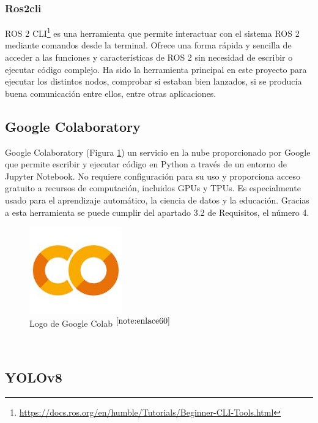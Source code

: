\subsubsection{Ros2cli}

\acs{ROS} 2 \ac{CLI}\footnote{\url{https://docs.ros.org/en/humble/Tutorials/Beginner-CLI-Tools.html}} es una herramienta que permite interactuar con el sistema ROS 2 mediante comandos desde la terminal. Ofrece una forma rápida y sencilla de acceder a las funciones y características de \acs{ROS} 2 sin necesidad de escribir o ejecutar código complejo. Ha sido la herramienta principal en este proyecto para ejecutar los distintos nodos, comprobar si estaban bien lanzados, si se producía buena comunicación entre ellos, entre otras aplicaciones.


\subsection{Google Colaboratory}

Google Colaboratory (Figura \ref{fig:googlecolab}) un servicio en la nube proporcionado por Google que permite escribir y ejecutar código en Python a través de un entorno de Jupyter Notebook. No requiere configuración para su uso y proporciona acceso gratuito a recursos de computación, incluidos GPUs y TPUs. Es especialmente usado para el aprendizaje automático, la ciencia de datos y la educación. Gracias a esta herramienta se puede cumplir del apartado 3.2 de Requisitos, el número 4.

\begin{figure} [h!]
	\begin{center}
		\includegraphics[width=4cm]{figs/googlecolab.png}
	\end{center}
	\caption{Logo de Google Colab $^{\ref{note:enlace60}}$} 
	\label{fig:googlecolab}
\end{figure}\

\setcounter{footnote}{60} %

\subsection{YOLOv8}


